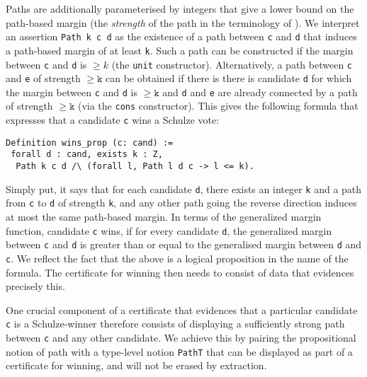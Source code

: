 \documentclass{llncs}
\begin{document}
\noindent
Paths are additionally parameterised by integers that give a lower
bound on the path-based margin (the \emph{strength} of the path in
the terminology of \cite{Schulze:2011:NMC}). We interpret an
assertion \texttt{Path k c d} as the existence of a path between
\texttt{c} and \texttt{d} that induces a path-based margin of at
least \texttt{k}. Such a path can be constructed 
if the margin between \texttt{c} and \texttt{d} is $\geq
k$ (the \texttt{unit} constructor). 
Alternatively, a path between \texttt{c} and \texttt{e} of strength
$\geq \mathtt{k}$ can be obtained if
there is there is candidate \texttt{d} for which the margin between
\texttt{c} and \texttt{d} is $\geq \mathtt{k}$ and \texttt{d} and
\texttt{e} are already connected by a path of strength $\geq
\mathtt{k}$ (via the \texttt{cons} constructor). 
%
%   
This gives the following formula that expresses that a candidate
\texttt{c} wins a Schulze vote:

\begin{verbatim}   
Definition wins_prop (c: cand) := 
 forall d : cand, exists k : Z, 
  Path k c d /\ (forall l, Path l d c -> l <= k).   
\end{verbatim} 


\noindent
Simply put, it says that for each candidate \texttt{d}, there exists
an integer \texttt{k} and a path from \texttt{c} to \texttt{d} of
strength \texttt{k}, and any other path going the reverse direction
induces at most the same path-based margin.  
In terms of the generalized margin function, 
candidate \texttt{c} wins, if for every candidate \texttt{d}, the generalized margin 
between \texttt{c} and \texttt{d} is greater than or equal to the
generalised margin between \texttt{d} and \texttt{c}.  We reflect
the fact that the above is a logical proposition in the name of the
formula. The certificate for winning then needs to consist of data
that evidences precisely this.

One crucial component of a certificate that evidences that a particular candidate
\texttt{c} is a Schulze-winner therefore consists of displaying a
sufficiently strong path between \texttt{c} and any other candidate.
We achieve this by pairing the propositional notion of path with a
type-level notion \texttt{PathT} that can be displayed as part of a
certificate for winning, and will not be erased by extraction.
\end{document}
